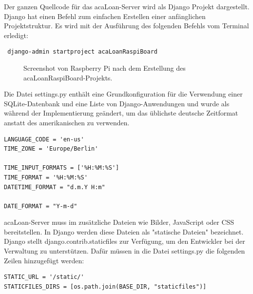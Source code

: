 Der ganzen Quellcode für das acaLoan-Server wird als Django Projekt dargestellt. Django hat einen Befehl zum einfachen Erstellen einer anfänglichen Projektstruktur. Es wird mit der Ausführung des folgenden Befehls vom Terminal erledigt:
\begin{lstlisting}
 django-admin startproject acaLoanRaspiBoard   
\end{lstlisting}

\begin{figure}
	\centering
	\caption{Screenshot von Raspberry Pi nach dem Erstellung des acaLoanRaspiBoard-Projekts.}
	\label{fig:django_start}
\end{figure}

Die Datei settings.py enthält eine Grundkonfiguration für die Verwendung einer SQLite-Datenbank und eine Liste von Django-Anwendungen und wurde als während der Implementierung geändert, um das üblichste deutsche Zeitformat anstatt des amerikanischen zu verwenden.
\begin{lstlisting}
LANGUAGE_CODE = 'en-us'
TIME_ZONE = 'Europe/Berlin'

TIME_INPUT_FORMATS = ['%H:%M:%S']
TIME_FORMAT = '%H:%M:%S'
DATETIME_FORMAT = "d.m.Y H:m"

DATE_FORMAT = "Y-m-d"
\end{lstlisting}

acaLoan-Server muss im zusätzliche Dateien wie Bilder, JavaScript oder CSS bereitstellen. In Django werden diese Dateien als "statische Dateien" bezeichnet. Django stellt django.contrib.staticfiles zur Verfügung, um den Entwickler bei der Verwaltung zu unterstützen. Dafür müssen in die Datei settings.py die folgenden Zeilen hinzugefügt werden:
\begin{lstlisting}
STATIC_URL = '/static/'
STATICFILES_DIRS = [os.path.join(BASE_DIR, "staticfiles")]
\end{lstlisting}

